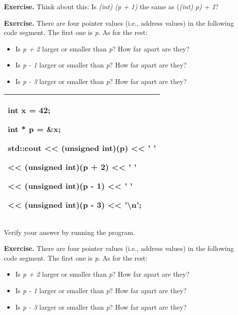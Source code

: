 \documentclass[
]{article}
\providecommand{\tightlist}{%
  \setlength{\itemsep}{0pt}\setlength{\parskip}{0pt}}
\begin{document}
\textbf{Exercise.} Think about this: Is \emph{(int) (p + 1)} the same as
(\emph{(int) p) + 1}?

\textbf{Exercise.} There are four pointer values (i.e., address values)
in the following code segment. The first one is \emph{p}. As for the
rest:

\begin{itemize}
\tightlist
\item
  Is \emph{p + 2} larger or smaller than \emph{p}? How far apart are
  they?
\item
  Is \emph{p - 1} larger or smaller than \emph{p}? How far apart are
  they?
\item
  Is \emph{p - 3} larger or smaller than \emph{p}? How far apart are
  they?
\end{itemize}

\begin{longtable}[]{@{}l@{}}
\toprule
\endhead
\begin{minipage}[t]{0.97\columnwidth}\raggedright
int x = 42;

int * p = \&x;

std::cout \textless\textless{} (unsigned int)(p) \textless\textless{} '
'

\textless\textless{} (unsigned int)(p + 2) \textless\textless{} ' '

\textless\textless{} (unsigned int)(p - 1) \textless\textless{} ' '

\textless\textless{} (unsigned int)(p - 3) \textless\textless{}
'\textbackslash n'; \strut
\end{minipage}\tabularnewline
\bottomrule
\end{longtable}

Verify your answer by running the program.

\textbf{Exercise.} There are four pointer values (i.e., address values)
in the following code segment. The first one is \emph{p}. As for the
rest:

\begin{itemize}
\tightlist
\item
  Is \emph{p + 2} larger or smaller than \emph{p}? How far apart are
  they?
\item
  Is \emph{p - 1} larger or smaller than \emph{p}? How far apart are
  they?
\item
  Is \emph{p - 3} larger or smaller than \emph{p}? How far apart are
  they?
\end{itemize}
\end{document}
